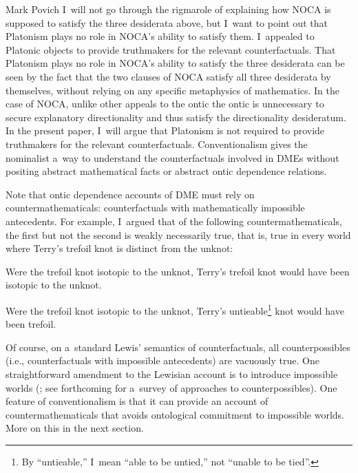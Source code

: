 \begin{artengenv}{Mark Povich}
I~will not go through the rigmarole of explaining how NOCA is supposed to satisfy the three desiderata above, but I~want to point out that Platonism plays no role in NOCA's ability to satisfy them. I~appealed to Platonic objects to provide truthmakers for the relevant counterfactuals. That Platonism plays no role in NOCA's ability to satisfy the three desiderata can be seen by the fact that the two clauses of NOCA satisfy all three desiderata by themselves, without relying on any specific metaphysics of mathematics. In the case of NOCA, unlike other appeals to the ontic
 the ontic is unnecessary to secure explanatory directionality and thus satisfy the directionality desideratum. In the present paper, I~will argue that Platonism is not required to provide truthmakers for the relevant counterfactuals. Conventionalism gives the nominalist a~way to understand the counterfactuals involved in DMEs without positing abstract mathematical facts or abstract ontic dependence relations.

Note that ontic dependence accounts of DME must rely on countermathematicals: counterfactuals with mathematically impossible antecedents. For example, I~argued that of the following countermathematicals, the first but not the second is weakly necessarily true, that is, true in every world where Terry's trefoil knot is distinct from the unknot:

Were the trefoil knot isotopic to the unknot, Terry's trefoil knot would have been isotopic to the unknot.

Were the trefoil knot isotopic to the unknot, Terry's untieable\footnote{By ``untieable,'' I~mean ``able to be untied,'' not ``unable to be tied''.} knot would have been trefoil.

Of course, on a~standard Lewis'
\parencite*[][]{lewis_counterfactuals_1973} %
 semantics of counterfactuals, all counterpossibles (i.e., counterfactuals with impossible antecedents) are vacuously true. One straightforward amendment to the Lewisian account is to introduce impossible worlds 
(\cite[][]{brogaard_remarks_2013}; see  forthcoming for a~survey of approaches to counterpossibles). %
 One feature of conventionalism is that it can provide an account of countermathematicals that avoids ontological commitment to impossible worlds. More on this in the next section.


\end{artengenv}
